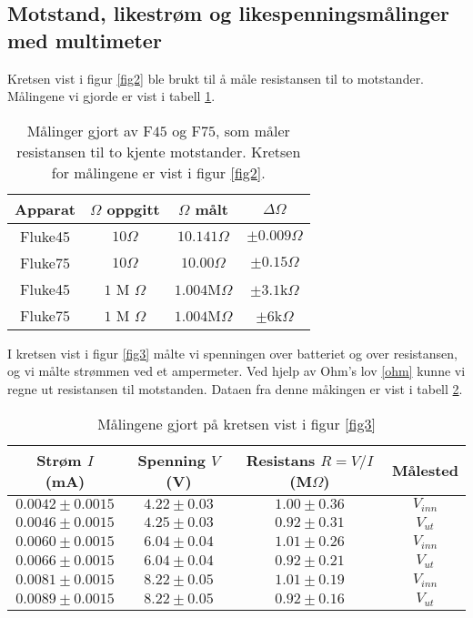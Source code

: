 \documentclass[%
 reprint,
nofootinbib,
aps,
]{revtex4-1}
\begin{document}
\subsection{Motstand, likestrøm og likespenningsmålinger
med multimeter}
Kretsen vist i figur \ref{fig2} ble brukt til å måle resistansen til to motstander. Målingene vi gjorde er vist i tabell \ref{table2}. \\
\begin{table}[h!]
\centering
\caption{Målinger gjort av F$45$ og F$75$, som måler resistansen til to kjente motstander. Kretsen for målingene er vist i figur \ref{fig2}.}
\label{table2}
\begin{tabular}{c c c c}
\toprule
Apparat & $\Omega$ oppgitt & $\Omega$ målt    & $\Delta \Omega$    \\
\hline
Fluke45 & $10\Omega$       & $10.141 \Omega$  & $\pm 0.009\Omega$ \\
Fluke75 & $10\Omega$       & $10.00\Omega$     & $\pm 0.15\Omega$    \\
Fluke45 & $1$ M $\Omega$   & $1.004$M$\Omega$ & $\pm 3.1$k$\Omega$ \\
Fluke75 & $1$ M $\Omega$   & $1.004$M$\Omega$ & $\pm 6$k$\Omega$   \\
\end{tabular}
\end{table}
I kretsen vist i figur \ref{fig3} målte vi spenningen over batteriet og over resistansen, og vi målte strømmen ved et ampermeter. Ved hjelp av Ohm's lov \eqref{ohm} kunne vi regne ut resistansen til motstanden. Dataen fra denne måkingen er vist i tabell \ref{table3}.
\begin{table}[h!]
\centering
\caption{Målingene gjort på kretsen vist i figur \ref{fig3}}
\label{table3}
\begin{tabular}{c c c c }
\toprule
    Strøm $I$ (mA) & Spenning $V$ (V) & Resistans $R = V/I$ (M$\Omega$) & Målested \\
\hline
 $ 0.0042 \pm 0.0015$  &   $4.22 \pm 0.03$ &                $  1.00 \pm 0.36 $ &      $V_{inn}$ \\
 $0.0046 \pm 0.0015$ &   $ 4.25 \pm 0.03$ &             $    0.92 \pm 0.31 $&     $ V_{ut} $\\
 $0.0060 \pm 0.0015$ &   $ 6.04 \pm 0.04$ &                 $ 1.01 \pm 0.26 $&     $ V_{inn}$ \\
 $0.0066 \pm 0.0015 $ &   $ 6.04 \pm 0.04$ &               $   0.92 \pm 0.21 $ &     $ V_{ut}$ \\
 $0.0081 \pm 0.0015$ &   $ 8.22 \pm 0.05$ &                 $ 1.01 \pm 0.19 $&     $ V_{inn}$ \\
$ 0.0089 \pm 0.0015$ &    $8.22 \pm 0.05$ &                  $0.92 \pm 0.16$ &      $V_{ut}$ \\
\end{tabular}
\end{table}
\end{document}
